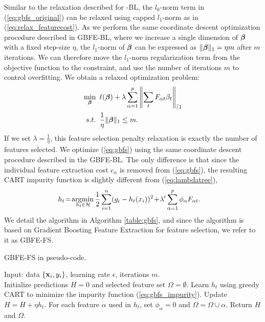 Similar to the relaxation described for \name{}-BL, the $l_0$-norm term in (\ref{eq:gbfs_original}) can be relaxed using capped $l_1$-norm as in (\ref{eq:relax_featurecost}). As we perform the same coordinate descent optimization procedure described in GBFE-BL, where we increase a single dimension of $\boldsymbol{\beta}$ with a fixed step-size $\eta$, the $l_1$-norm of $\boldsymbol{\beta}$ can be expressed as $\|\boldsymbol{\beta}\|_1 = \eta m$ after $m$ iterations. We can therefore move the $l_1$-norm regularization term from the objective function to the constraint, and use the number of iterations $m$ to control overfitting. We obtain a relaxed optimization problem:
\begin{align}
    \min_{\boldsymbol{\beta}} & \hspace{5pt} \ell(\boldsymbol{\beta}) + \lambda \sum_{\alpha=1}^p \left\|\sum_t F_{\alpha t} \beta_t\right\|_{\lceil 1} \label{eq:gbfs}\\
	s.t. & \hspace{5pt} \frac{1}{\eta}\|\boldsymbol{\beta}\|_1 \le m. \nonumber	
\end{align} 
If we set $\lambda = \frac{1}{\eta}$, this feature selection penalty relaxation is exactly the number of features selected.
We optimize (\ref{eq:gbfs}) using the same coordinate descent procedure described in the GBFE-BL. The only difference is that since the individual feature extraction cost $c_{\alpha}$ is removed from (\ref{eq:gbfs}), the resulting CART impurity function is slightly different from (\ref{eq:lambdatree}),
\begin{align}
	h_t\!=\!\arg\!\min_{\hspace{-3ex}h_t\in{\cal H}} \frac{1}{2}\displaystyle\sum_{i=1}^n (g_i-h_t(x_i))^2 \!+\! \lambda' \sum_{\alpha=1}^p \phi_{\alpha} F_{\alpha t}. & \label{eq:gbfs_impurity}
\end{align}
We detail the algorithm in Algorithm \ref{table:gbfs}, and since the algorithm is based on Gradient Boosting Feature Extraction for feature selection, we refer to it as GBFE-FS.
\begin{algorithm}[t!!!]
	\caption{GBFE-FS in pseudo-code.\label{table:gbfs}}
	\label{algo}
	\begin{algorithmic}[1]
	\STATE Input: data $\{\mathbf{x}_i, y_i\}$, learning rate $\epsilon$, iterations $m$. \\
	\STATE Initialize predictions $H = 0$ and selected feature set $\Omega = \emptyset$.
	\STATE Learn $h_t$ using greedy CART to minimize the impurity function (\ref{eq:gbfs_impurity}).
	\STATE Update $H = H + \eta h_t$.
	\STATE For each feature $\alpha$ used in $h_t$, set $\phi_\alpha = 0$ and $\Omega = \Omega \cup \alpha$.
	\ENDFOR
	\STATE Return $H$ and $\Omega$.
	\end{algorithmic}
\end{algorithm}

